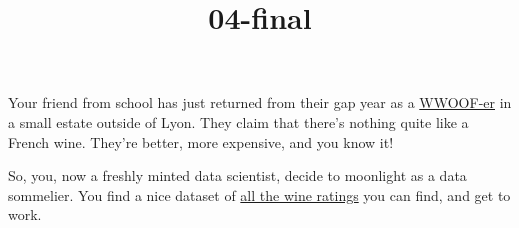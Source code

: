 \documentclass[]{tufte-handout}
\title{04-final}
\date{}
\newenvironment{Shaded}{}{}
\newcommand{\DecValTok}[1]{\textcolor[rgb]{0.25,0.63,0.44}{#1}}
\newcommand{\KeywordTok}[1]{\textcolor[rgb]{0.00,0.44,0.13}{\textbf{#1}}}
\newcommand{\NormalTok}[1]{#1}
\newcommand{\OperatorTok}[1]{\textcolor[rgb]{0.40,0.40,0.40}{#1}}
\newcommand{\StringTok}[1]{\textcolor[rgb]{0.25,0.44,0.63}{#1}}
\begin{document}
\maketitle




Your friend from school has just returned from their gap year as a
\href{https://wwoof.org.uk/}{WWOOF-er} in a small estate outside of
Lyon. They claim that there's nothing quite like a French wine. They're
better, more expensive, and you know it!

So, you, now a freshly minted data scientist, decide to moonlight as a
data sommelier. You find a nice dataset of
\href{https://www.kaggle.com/zynicide/wine-reviews}{all the wine
ratings} you can find, and get to work.

\begin{Shaded}
\end{Shaded}
\end{document}

